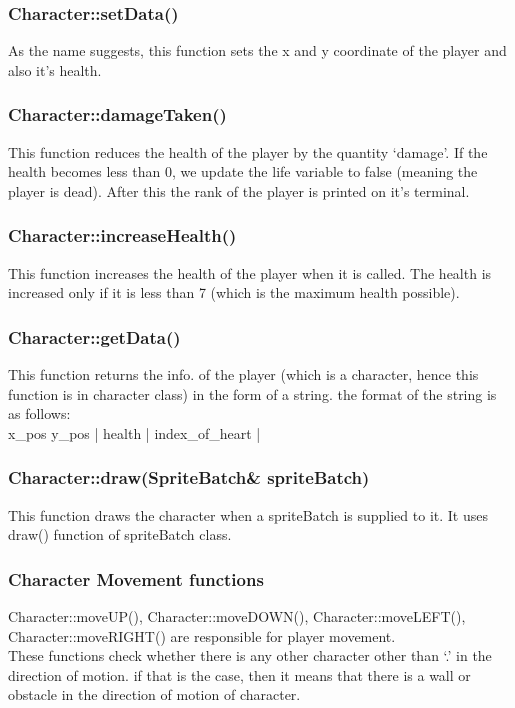 \documentclass{article}
\begin{document}
\subsubsection{Character::setData()}
As the name suggests, this function sets the x and y coordinate of the player and also it’s health.
\newline

\subsubsection{Character::damageTaken()}
This function reduces the health of the player by the quantity ‘damage’. If the health becomes less than 0, we update the life variable to false (meaning the player is dead). After this the rank of the player is printed on it’s terminal. 
\newline

\subsubsection{Character::increaseHealth()}
This function increases the health of the player when it is called. The health is increased only if it is less than 7 (which is the maximum health possible).
\newline

\subsubsection{Character::getData()}
This function returns the info. of the player (which is a character, hence this function is in character class) in the form of a string. the format of the string is as follows: \\
\newline
x\_pos y\_pos | health | index\_of\_heart |
\newline

\subsubsection{Character::draw(SpriteBatch& spriteBatch) }
This function draws the character when a spriteBatch is supplied to it. It uses draw() function of spriteBatch class.
\newline

\subsubsection{Character Movement functions}
Character::moveUP(), Character::moveDOWN(), Character::moveLEFT(), Character::moveRIGHT() are responsible for player movement.\\
\newline
These functions check whether there is any other character other than ‘.’ in the direction of motion. if that is the case, then it means that there is a wall or obstacle in the direction of motion of character. \\
\end{document}

